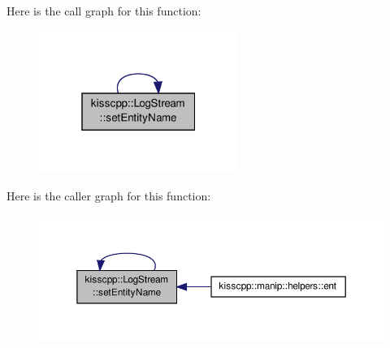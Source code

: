 Here is the call graph for this function\-:\nopagebreak
\begin{figure}[H]
\begin{center}
\leavevmode
\includegraphics[width=184pt]{classkisscpp_1_1_log_stream_adaf27d5069674b2e934883c107187686_cgraph}
\end{center}
\end{figure}




Here is the caller graph for this function\-:\nopagebreak
\begin{figure}[H]
\begin{center}
\leavevmode
\includegraphics[width=350pt]{classkisscpp_1_1_log_stream_adaf27d5069674b2e934883c107187686_icgraph}
\end{center}
\end{figure}


